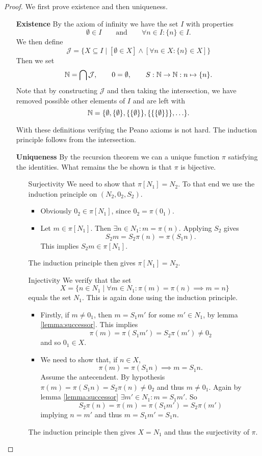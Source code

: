 \begin{proof}
We first prove existence and then uniqueness.
\begin{itemize}
\item[\textbf{Existence}] By the axiom of infinity we have the set $I$ with properties
\[ \emptyset\in I \qquad \text{and}\qquad \forall n\in I: \{n\}\in I. \]
We then define
\[ \mathcal{J} = \{ X\subseteq I\;|\;[\emptyset\in X] \land [\forall n\in X: \{n\} \in X] \} \]
Then we set
\[ \mathbb{N} = \bigcap \mathcal{J},\qquad 0 = \emptyset, \qquad S: \mathbb{N}\to\mathbb{N}: n\mapsto \{n\}. \]
Note that by constructing $\mathcal{J}$ and then taking the intersection, we have removed possible other elements of $I$ and are left with
\[ \mathbb{N} = \{ \emptyset, \{\emptyset\}, \{\{\emptyset\}\}, \{\{\{\emptyset\}\}\}, \ldots \}. \]

With these definitions verifying the Peano axioms is not hard. The induction principle follows from the intersection.
\item[\textbf{Uniqueness}] By the recursion theorem we can a unique function $\pi$ satisfying the identities. What remains the be shown is that $\pi$ is bijective.
\begin{itemize}
\item[Surjectivity] We need to show that $\pi[N_1] = N_2$. To that end we use the induction principle on $(N_2,0_2, S_2)$.
\begin{itemize}
\item Obviously $0_2\in \pi[N_1]$, since $0_2=\pi(0_1)$.
\item Let $m\in\pi[N_1]$. Then $\exists n\in N_1: m=\pi(n)$. Applying $S_2$ gives
\[ S_2m = S_2\pi(n) = \pi(S_1 n). \]
This implies $S_2m\in \pi[N_1]$.
\end{itemize}
The induction principle then gives $\pi[N_1] = N_2$.
\item[Injectivity] We verify that the set
\[ X = \{ n\in N_1\;|\; \forall m\in N_1: \pi(m)=\pi(n) \implies m=n \} \]
equals the set $N_1$. This is again done using the induction principle.
\begin{itemize}
\item Firstly, if $m\neq 0_1$, then $m=S_1m'$ for some $m'\in N_1$, by lemma \ref{lemma:successor}. This implies
\[ \pi(m) = \pi(S_1m') = S_2\pi(m') \neq 0_2 \]
and so $0_1\in X$.
\item We need to show that, if $n\in X$,
\[ \pi(m) = \pi(S_1n) \implies m = S_1n. \]
Assume the antecendent. By hypothesis $\pi(m) = \pi(S_1n) = S_2\pi(n) \neq 0_2$ and thus $m\neq 0_1$. Again by lemma \ref{lemma:successor} $\exists m'\in N_1: m = S_1m'$. So
\[ S_2\pi(n) = \pi(m) = \pi(S_1m') = S_2\pi(m') \]
implying $n=m'$ and thus $m=S_1m'=S_1n$.
\end{itemize}
The induction principle then gives $X=N_1$ and thus the surjectivity of $\pi$.
\end{itemize}
\end{itemize}
\end{proof}

